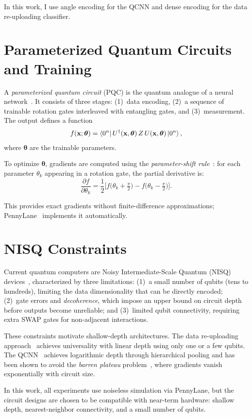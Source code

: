 In this work, I use angle encoding for the QCNN and dense encoding for the data re-uploading classifier.

\section{Parameterized Quantum Circuits and Training}
\label{sec:pqc}

A \emph{parameterized quantum circuit} (PQC) is the quantum analogue of a neural network~\cite{benedetti2019parameterized}. It consists of three stages: (1)~data encoding, (2)~a sequence of trainable rotation gates interleaved with entangling gates, and (3)~measurement. The output defines a function 
\[
f(\mathbf{x}; \boldsymbol{\theta}) = \bra{0^n} U^\dagger(\mathbf{x}, \boldsymbol{\theta})\, Z\, U(\mathbf{x}, \boldsymbol{\theta}) \ket{0^n},
\]
where $\boldsymbol{\theta}$ are the trainable parameters.

To optimize $\boldsymbol{\theta}$, gradients are computed using the \emph{parameter-shift rule}~\cite{mitarai2018quantum}: for each parameter $\theta_k$ appearing in a rotation gate, the partial derivative is:
\begin{equation}
    \frac{\partial f}{\partial \theta_k} 
    = \frac{1}{2}\Big[ 
    f\!\big(\theta_k + \tfrac{\pi}{2}\big) 
    - 
    f\!\big(\theta_k - \tfrac{\pi}{2}\big) 
    \Big].
    \label{eq:param_shift}
\end{equation}

This provides exact gradients without finite-difference approximations; PennyLane~\cite{pennylane} implements it automatically.
\section{NISQ Constraints}
\label{sec:nisq}

Current quantum computers are Noisy Intermediate-Scale Quantum (NISQ) devices~\cite{preskill2018quantum}, characterized by three limitations: (1)~a small number of qubits (tens to hundreds), limiting the data dimensionality that can be directly encoded; (2)~gate errors and \emph{decoherence}, which impose an upper bound on circuit depth before outputs become unreliable; and (3)~limited qubit connectivity, requiring extra SWAP gates for non-adjacent interactions.

These constraints motivate shallow-depth architectures. The data re-uploading approach~\cite{perez2020data} achieves universality with linear depth using only one or a few qubits. The QCNN~\cite{hur2022quantum} achieves logarithmic depth through hierarchical pooling and has been shown to avoid the \emph{barren plateau} problem~\cite{mcclean2018barren}, where gradients vanish exponentially with circuit size.

In this work, all experiments use noiseless simulation via PennyLane, but the circuit designs are chosen to be compatible with near-term hardware: shallow depth, nearest-neighbor connectivity, and a small number of qubits.

